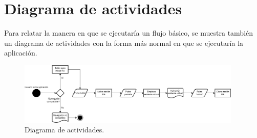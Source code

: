 \documentclass{subfiles}
\begin{document}
        \section{Diagrama de actividades}
        \label{sec:diagrama_de_actividades}
        
Para relatar la manera en que se ejecutaría un flujo básico, se muestra también un diagrama de actividades con la forma más normal en que se ejecutaría la aplicación.

\begin{figure}[ht]
\centering
\includegraphics[width=0.95\textwidth]{img/analisis_y_diseno_diagrama_de_actividades.png}
\caption{Diagrama de actividades.}
\label{fig:analisis_y_diseno_diagrama_de_actividades}
\end{figure}
\end{document}

